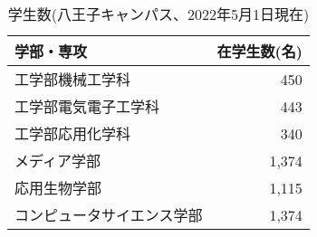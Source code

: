 \begin{table}
    \centering
    \caption{学生数(八王子キャンパス、2022年5月1日現在)}
    \label{tab:students}
    \begin{tabular}{|l|r|}
        \hline
        学部・専攻 & 在学生数(名)\\
        \hline
        \hline
        工学部機械工学科 & 450\\ \hline
        工学部電気電子工学科 & 443\\ \hline
        工学部応用化学科 & 340\\ \hline
        メディア学部 & 1,374\\ \hline
        応用生物学部 & 1,115\\ \hline
        コンピュータサイエンス学部 & 1,374\\
        \hline
    \end{tabular}
\end{table}